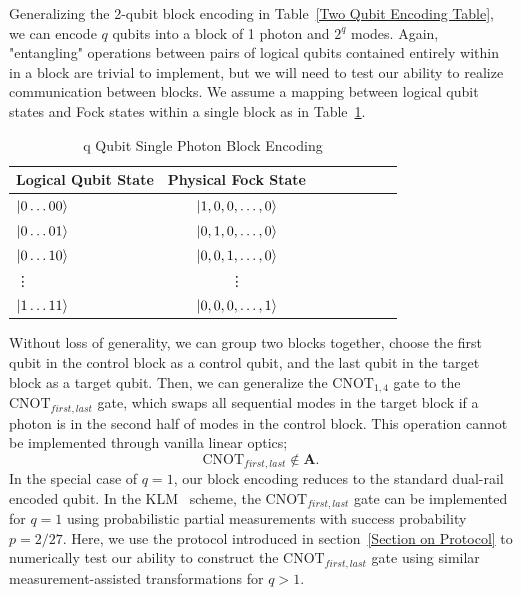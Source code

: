 \documentclass[aps,pra,twocolumn,showpacs,superscriptaddress,floatfix,10pt]{revtex4}
\begin{document}
Generalizing the 2-qubit block encoding in Table~\ref{Two Qubit Encoding Table}, we can encode $q$ qubits into a block of 1 photon and $2^q$ modes. Again, "entangling" operations between pairs of logical qubits contained entirely within in a block are trivial to implement, but we will need to test our ability to realize communication between blocks. We assume a  mapping between logical qubit states and Fock states within a single block as in Table~\ref{q Qubit Block Encoding}.
\begin {table}[h]
\begin{center}
	\begin{tabular}{l*{6}{c}r} 
		Logical Qubit State      \quad \quad \quad     & Physical Fock State \\
		\hline 
		\quad \quad \quad $\ket{0\dots00}$     & $\ket{1,0,0,\dots,0}$ \\
		\quad \quad \quad $\ket{0\dots01}$            & $\ket{0,1,0,\dots,0}$ \\
		\quad \quad \quad $\ket{0\dots10}$            & $\ket{0,0,1,\dots,0}$ \\
		\quad \quad \quad \quad \enspace \vdots & \vdots \\
		\quad \quad \quad $\ket{1\dots11}$            & $\ket{0,0,0,\dots,1}$ \\
	\end{tabular}
	\caption{ \label{q Qubit Block Encoding} q Qubit Single Photon Block Encoding}
\end{center}
\end{table}
Without loss of generality, we can group two blocks together, choose the first qubit in the control block as a control qubit, and the last qubit in the target block as a target qubit. Then, we can generalize the $\mbox{CNOT}_{1,4}$ gate to the $\mbox{CNOT}_{first,last}$ gate, which swaps all sequential modes in the target block if a photon is in the second half of modes in the control block. This operation cannot be implemented through vanilla linear optics;
\begin{equation}
\mbox{CNOT}_{first,last} \notin \textbf{A}.
\end{equation}
In the special case of $q=1$, our block encoding reduces to the standard dual-rail encoded qubit\cite{Dual Rail}. In the KLM~\cite{KLM,Uskov} scheme, the $\mbox{CNOT}_{first,last}$ gate can be implemented for $q=1$ using probabilistic partial measurements with success probability $p=2/27$. Here, we use the protocol introduced in section~\ref{Section on Protocol} to numerically test our ability to construct the $\mbox{CNOT}_{first,last}$ gate using similar measurement-assisted transformations for $q>1$.
\end{document}
